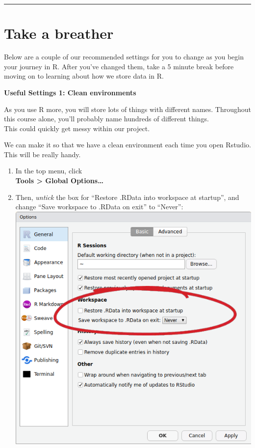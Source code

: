 \documentclass[]{book}
\providecommand{\tightlist}{%
  \setlength{\itemsep}{0pt}\setlength{\parskip}{0pt}}
\begin{document}
\begin{center}\rule{0.5\linewidth}{0.5pt}\end{center}

\hypertarget{take-a-breather}{%
\section{Take a breather}\label{take-a-breather}}

Below are a couple of our recommended settings for you to change as you begin your journey in R.
After you've changed them, take a 5 minute break before moving on to learning about how we store data in R.

\textbf{Useful Settings 1: Clean environments}

As you use R more, you will store lots of things with different names. Throughout this course alone, you'll probably name hundreds of different things.\\
This could quickly get messy within our project.

We can make it so that we have a clean environment each time you open Rstudio. This will be really handy.

\begin{enumerate}
\def\labelenumi{\arabic{enumi}.}
\tightlist
\item
  In the top menu, click\\
  \textbf{Tools \textgreater{} Global Options\ldots{}}
\item
  Then, \emph{untick} the box for ``Restore .RData into workspace at startup'', and change ``Save workspace to .RData on exit'' to ``Never'':
  \includegraphics{images/installing_intro/renvsettings.png}
\end{enumerate}
\end{document}
